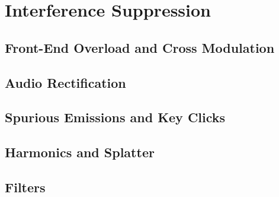\section{Interference Suppression}

\subsection{Front-End Overload and Cross Modulation}

\subsection{Audio Rectification}

\subsection{Spurious Emissions and Key Clicks}

\subsection{Harmonics and Splatter}

\subsection{Filters}
